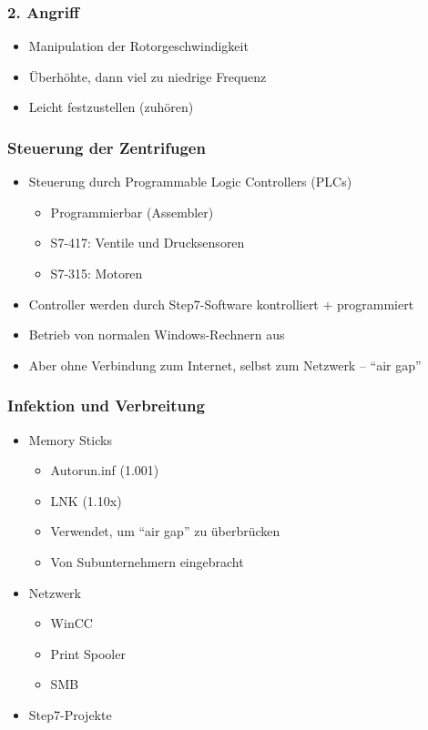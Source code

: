 \documentclass{beamer}
\begin{document}
\begin{frame}
  \frametitle{2. Angriff}
  \begin{itemize}
    \item Manipulation der Rotorgeschwindigkeit
    \item Überhöhte, dann viel zu niedrige Frequenz
    \item Leicht festzustellen (zuhören)
  \end{itemize}
\end{frame}

\begin{frame}
  \frametitle{Steuerung der Zentrifugen}
  \begin{itemize}
    \item Steuerung durch Programmable Logic Controllers (PLCs)
      \begin{itemize}
        \item Programmierbar (Assembler)
        \item S7-417: Ventile und Drucksensoren
        \item S7-315: Motoren
      \end{itemize}
    \item Controller werden durch Step7-Software kontrolliert + programmiert
    \item Betrieb von normalen Windows-Rechnern aus
    \item Aber ohne Verbindung zum Internet, selbst zum Netzwerk – “air gap”
  \end{itemize}
\end{frame}

\begin{frame}
  \frametitle{Infektion und Verbreitung}
  \begin{itemize}
    \item Memory Sticks
      \begin{itemize}
        \item Autorun.inf (1.001)
        \item LNK (1.10x)
        \item Verwendet, um “air gap” zu überbrücken
        \item Von Subunternehmern eingebracht
      \end{itemize}
    \item Netzwerk
      \begin{itemize}
        \item WinCC
        \item Print Spooler
        \item SMB
      \end{itemize}
    \item Step7-Projekte
  \end{itemize}
\end{frame}
\end{document}
